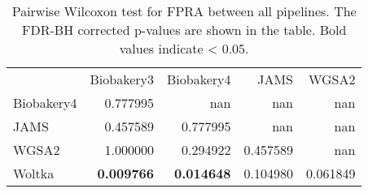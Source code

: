 \begin{table}
\caption{Pairwise Wilcoxon test for FPRA between all pipelines. The FDR-BH corrected p-values are shown in the table. Bold values indicate < 0.05.}
\label{tab:pairwise_FPRA}
\begin{tabular}{lrrrr}
 & Biobakery3 & Biobakery4 & JAMS & WGSA2 \\
Biobakery4 & 0.777995 & nan & nan & nan \\
JAMS & 0.457589 & 0.777995 & nan & nan \\
WGSA2 & 1.000000 & 0.294922 & 0.457589 & nan \\
Woltka & \bfseries 0.009766 & \bfseries 0.014648 & 0.104980 & 0.061849 \\
\end{tabular}
\end{table}
